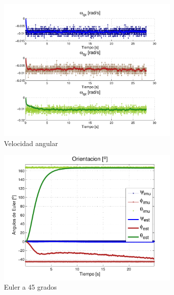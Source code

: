 \documentclass[main]{subfiles}
\begin{document}
\begin{figure}[h!]
	\centering
	\includegraphics[width=0.8\textwidth]{./pics_kalman/wq.pdf}
	\caption{Velocidad angular}
	\label{fig:wq}
\end{figure}
\begin{figure}[h!]
	\centering
	\includegraphics[width=0.8\textwidth]{./pics_kalman/45.pdf}
	\caption{Euler a 45 grados}
	\label{fig:45x}
\end{figure}
\end{document}
